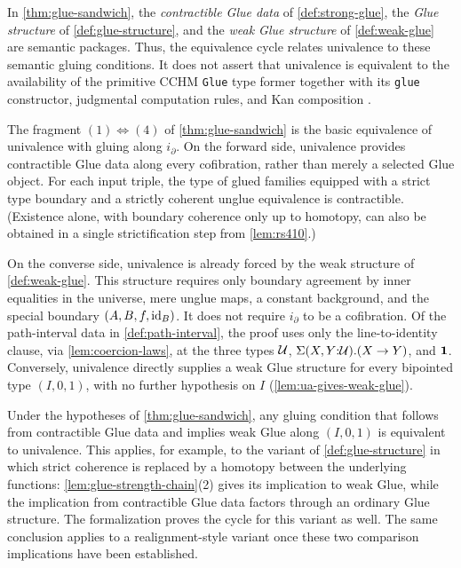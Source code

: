 \begin{longversion}
  \begin{remark}\label{rem:glue-sandwich-consequences}
	In \cref{thm:glue-sandwich}, the \emph{contractible Glue data} of
	\cref{def:strong-glue}, the \emph{Glue structure} of
	\cref{def:glue-structure}, and the \emph{weak Glue structure} of
	\cref{def:weak-glue} are semantic packages. Thus, the equivalence cycle
	relates univalence to these semantic gluing conditions. It does not assert
	that univalence is equivalent to the availability of the primitive CCHM
	\texttt{Glue} type former together with its \texttt{glue} constructor,
	judgmental computation rules, and Kan composition
	\citep[Fig.~4, \S\S6--7]{CCHM2018}.
	
	The fragment $(1)\Leftrightarrow(4)$ of \cref{thm:glue-sandwich} is the
	basic equivalence of univalence with gluing along $i_\partial$.
	On the forward side, univalence provides contractible Glue data along
	every cofibration, rather than merely a selected Glue object. For each
	input triple, the type of glued families equipped with a strict type
	boundary and a strictly coherent unglue equivalence is contractible.
	(Existence alone, with boundary coherence only up to homotopy, can also
	be obtained in a single strictification step from \cref{lem:rs410}.)
	
	On the converse side, univalence is already forced by the weak structure
	of \cref{def:weak-glue}. This structure requires only boundary agreement
	by inner equalities in the universe, mere unglue maps, a constant
	background, and the special boundary $(A,B,f,\operatorname{id}_B)$. It does not require
	$i_\partial$ to be a cofibration. Of the path-interval data in
	\cref{def:path-interval}, the proof uses only the line-to-identity clause,
	via \cref{lem:coercion-laws}, at the three types $\mathcal{U}$,
	$\Sigma(X,Y{:}\mathcal{U}).(X\to Y)$, and $\mathbf{1}$.
	Conversely, univalence directly supplies a weak Glue structure for every
	bipointed type $(I,0,1)$, with no further hypothesis on $I$
	(\cref{lem:ua-gives-weak-glue}).
	
	Under the hypotheses of \cref{thm:glue-sandwich}, any gluing condition
	that follows from contractible Glue data and implies weak Glue along
	$(I,0,1)$ is equivalent to univalence. This applies, for example, to the
	variant of \cref{def:glue-structure} in which strict coherence is replaced
	by a homotopy between the underlying functions:
	\cref{lem:glue-strength-chain}(2) gives its implication to weak Glue, while
	the implication from contractible Glue data factors through an ordinary
	Glue structure. The formalization proves the cycle for this variant as
	well. The same conclusion applies to a realignment-style variant once
	these two comparison implications have been established.
\end{remark}
\end{longversion}



